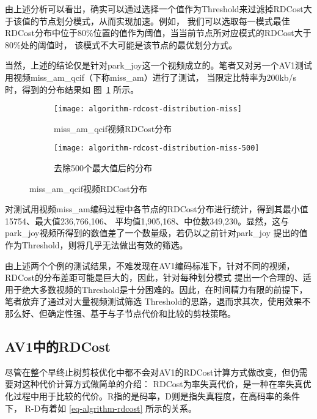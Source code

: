 由上述分析可以看出，确实可以通过选择一个值作为Threshold来过滤掉RDCost大于该值的节点划分模式，从而实现加速。例如，
我们可以选取每一模式最佳RDCost分布中位于80\%位置的值作为阈值，当当前节点所对应模式的RDCost大于80\%处的阈值时，
该模式不大可能是该节点的最优划分方式。

当然，上述的结论仅是针对park\_joy这一个视频成立的。笔者又对另一个AV1测试用视频miss\_am\_qcif（下称miss\_am）进行了测试，
当限定比特率为200kb/s时，得到的分布结果如 图~\ref{fig:algorithm-rdcost-distribution-miss} 所示。

\begin{figure}[H]
  \centering%
  \begin{subfigure}{0.43\textwidth}
    \centering
    \texttt{[image: algorithm-rdcost-distribution-miss]}
    \caption{miss\_am\_qcif视频RDCost分布}
  \end{subfigure}%
  \hspace{2em}%
  \begin{subfigure}{0.43\textwidth}
    \centering
    \texttt{[image: algorithm-rdcost-distribution-miss-500]}
    \caption{去除500个最大值后的分布}
  \end{subfigure}
  \caption{miss\_am\_qcif视频RDCost分布}
  \label{fig:algorithm-rdcost-distribution-miss}
\end{figure}

对测试用视频miss\_am编码过程中各节点的RDCost分布进行统计，得到其最小值15754、最大值236,766,106、
平均值1,905,168、中位数349,230。显然，这与park\_joy视频所得到的数值差了一个数量级，若仍以之前针对park\_joy
提出的值作为Threshold，则将几乎无法做出有效的筛选。

由上述两个个例的测试结果，不难发现在AV1编码标准下，针对不同的视频，RDCost的分布差距可能是巨大的，因此，针对每种划分模式
提出一个合理的、适用于绝大多数视频的Threshold是十分困难的。因此，在时间精力有限的前提下，笔者放弃了通过对大量视频测试筛选
Threshold的思路，退而求其次，使用效果不那么好、但确定性强、基于与子节点代价和比较的剪枝策略。

\subsection{AV1中的RDCost}

尽管在整个早终止树剪枝优化中都不会对AV1的RDCost计算方式做改变，但仍需要对这种代价计算方式做简单的介绍：
RDCost为率失真代价，是一种在率失真优化过程中用于比较的代价。R指的是码率，D则是指失真程度，在高码率的条件下，
R-D有着如 \ref{eq-algrithm-rdcost} 所示的关系。

